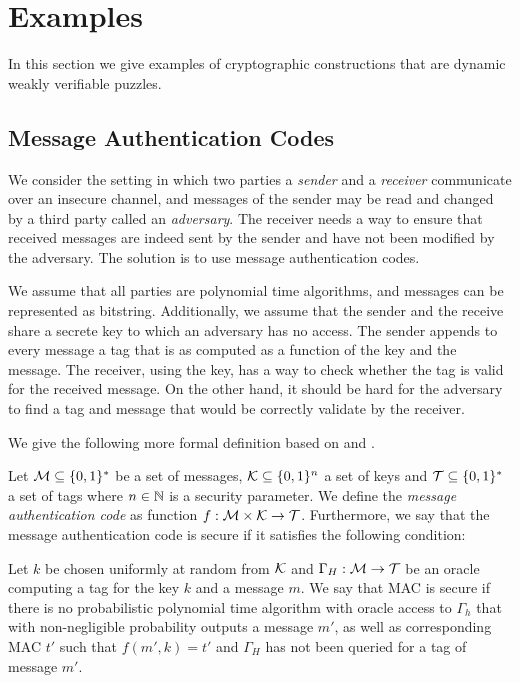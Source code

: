 \documentclass[11pt,a4paper,titlepage]{memoir}
\begin{document}
\section{Examples}
\label{section:wvp_examples}
In this section we give examples of cryptographic constructions that are dynamic weakly verifiable puzzles.

\subsection{Message Authentication Codes}
We consider the setting in which two parties a \textit{sender} and a \textit{receiver} communicate over an insecure channel, and
messages of the sender may be read and changed by a third party called an \textit{adversary}.
The receiver needs a way to ensure that received messages are indeed sent by the sender and have not been modified by the adversary.
The solution is to use message authentication codes.

We assume that all parties are polynomial time algorithms, and messages can be represented as bitstring.
Additionally, we assume that the sender and the receive share a secrete key to which an adversary has no access.
The sender appends to every message a tag that is as computed as a function of the key and the message.
The receiver, using the key, has a way to check whether the tag is valid for the received message.
On the other hand, it should be hard for the adversary to find a tag and message that would be correctly validate by the receiver.

We give the following more formal definition based on \cite{LectureNotesCrypo} and \cite{Goldreich:2004:FCV:975541}.
\begin{definition}
  Let $\mathcal{M} \subseteq \{0,1\}^*$ be a set of messages, $\mathcal{K} \subseteq \{0,1\}^{n}$ a set of keys and $\mathcal{T} \subseteq \{0,1\}^*$ a set of tags where $n \in \mathbb{N}$
  is a security parameter. We define the \textit{message authentication code} as function $f:\mathcal{M} \times \mathcal{K} \rightarrow \mathcal{T}$. Furthermore, we say
  that the message authentication code is secure if it satisfies the following condition:

  Let $k$ be chosen uniformly at random from $\mathcal{K}$ and $\Gamma_H: \mathcal{M} \rightarrow \mathcal{T}$ be an oracle computing
  a tag for the key $k$ and a message $m$. We say that MAC is secure if there is no probabilistic polynomial time algorithm with oracle access to $\Gamma_h$
  that with non-negligible probability outputs a message $m'$, as well as corresponding MAC $t'$ such that $f(m', k) = t'$
  and $\Gamma_H$ has not been queried for a tag of message $m'$.
\end{definition}
\end{document}
